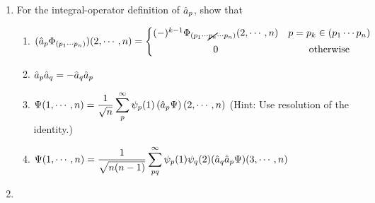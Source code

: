 \documentclass[11pt]{article}
\numberwithin{equation}{section}
\begin{document}
\begin{enumerate}
\item
  For the integral-operator definition of $\hat{a}_p$, show that
  \begin{enumerate}
  \item
  $
    (\op{a}_p\F_{(p_1\cd p_n)})(2,\cd,n)
  =
  \left\{
  \ar{
    (-)^{k-1}\F_{(p_1\cd \cancel{p_k}\cd p_n)}(2,\cd,n) & p=p_k\in(p_1\cd p_n)\\[5pt]
    0 & \text{otherwise}
  }
  \right.
  $
  \item
  $\hat{a}_p\hat{a}_q = - \hat{a}_q\hat{a}_p$
  \item
  ${\displaystyle
    \Psi (1,\cdots,n)
  =
    \frac {1}{\sqrt{n}}
    \sum_p^\infty\psi _p(1)\left(\hat{a}_p\Psi \right)(2,\cdots,n)
  }$
  \hspace{20pt}
  (Hint: Use resolution of the identity.)  \item
  ${\displaystyle
    \Psi (1,\cdots,n)
  =
    \frac {1}{\sqrt{n(n-1)}}
    \sum_{pq}^\infty
    \psi _p(1)\psi _q(2)(\hat{a}_q\hat{a}_p\Psi )(3,\cdots,n)
  }$
  \end{enumerate}


\item
  
\end{enumerate}
\end{document}
